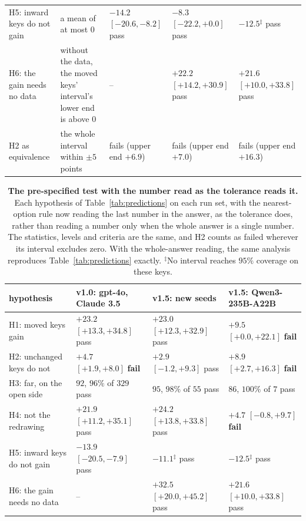 \documentclass{article}
\begin{document}
\begin{table}[htbp]
\begin{tabularx}{\linewidth}{@{}p{2.2cm}Xp{2.35cm}p{2.35cm}p{2.35cm}@{}}
H5: inward keys do not gain & a mean of at most 0 & $-14.2$ {\scriptsize$[-20.6,-8.2]$} pass & $-8.3$ {\scriptsize$[-22.2,+0.0]$} pass & $-12.5$$^{\ddagger}$ pass\\
H6: the gain needs no data & without the data, the moved keys' interval's lower end is above 0 & -- & $+22.2$ {\scriptsize$[+14.2,+30.9]$} pass & $+21.6$ {\scriptsize$[+10.0,+33.8]$} pass\\
H2 as equivalence & the whole interval within $\pm5$ points & fails (upper end $+6.9$) & fails (upper end $+7.0$) & fails (upper end $+16.3$)\\
\bottomrule
\end{tabularx}
\end{table}

\begin{table}[htbp]
\centering\scriptsize\setlength{\tabcolsep}{3pt}
\caption{\textbf{The pre-specified test with the number read as the tolerance reads it.} Each hypothesis of
Table~\ref{tab:predictions} on each run set, with the nearest-option rule now reading the last number in the answer,
as the tolerance does, rather than reading a number only when the whole answer is a single number. The statistics,
levels and criteria are the same, and H2 counts as failed wherever its interval excludes zero. With the whole-answer
reading, the same analysis reproduces Table~\ref{tab:predictions} exactly.
$^{\ddagger}$No interval reaches $95\%$ coverage on these keys.}
\label{tab:lastnumber}
\begin{tabular}{llll}
\toprule
hypothesis & v1.0: gpt-4o, Claude 3.5 & v1.5: new seeds & v1.5: Qwen3-235B-A22B\\
\midrule
H1: moved keys gain & $+23.2$ {\scriptsize$[+13.3,+34.8]$} pass & $+23.0$ {\scriptsize$[+12.3,+32.9]$} pass & $+9.5$ {\scriptsize$[+0.0,+22.1]$} \textbf{fail}\\
H2: unchanged keys do not & $+4.7$ {\scriptsize$[+1.9,+8.0]$} \textbf{fail} & $+2.9$ {\scriptsize$[-1.2,+9.3]$} pass & $+8.9$ {\scriptsize$[+2.7,+16.3]$} \textbf{fail}\\
H3: far, on the open side & $92$, $96\%$ of $329$ pass & $95$, $98\%$ of $55$ pass & $86$, $100\%$ of $7$ pass\\
H4: not the redrawing & $+21.9$ {\scriptsize$[+11.2,+35.1]$} pass & $+24.2$ {\scriptsize$[+13.8,+33.8]$} pass & $+4.7$ {\scriptsize$[-0.8,+9.7]$} \textbf{fail}\\
H5: inward keys do not gain & $-13.9$ {\scriptsize$[-20.5,-7.9]$} pass & $-11.1$$^{\ddagger}$ pass & $-12.5$$^{\ddagger}$ pass\\
H6: the gain needs no data & -- & $+32.5$ {\scriptsize$[+20.0,+45.2]$} pass & $+21.6$ {\scriptsize$[+10.0,+33.8]$} pass\\
\bottomrule
\end{tabular}
\end{table}
\end{document}
